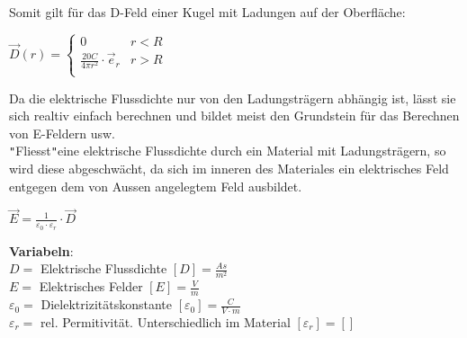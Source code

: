 Somit gilt für das D-Feld einer Kugel mit Ladungen auf der Oberfläche: \\
\begin{center}

	$
	\vec{D}(r) =
	\begin{cases}
		0                                       & r < R \\
		\frac{20 C}{4 \pi r^2} \cdot  \vec{e}_r & r > R \\
	\end{cases}$

\end{center}
\iend




Da die elektrische Flussdichte nur von den Ladungsträgern abhängig ist, lässt sie sich realtiv einfach berechnen und bildet meist den Grundstein für
das Berechnen von E-Feldern usw. \\
\texttt{"}Fliesst\texttt{"}eine elektrische Flussdichte durch ein Material mit Ladungsträgern, so wird diese abgeschwächt, da sich im inneren des Materiales ein
elektrisches Feld entgegen dem von Aussen angelegtem Feld ausbildet. \\
\begin{center}
\end{center}

\begingl
\begin{center}
	\formulaBegin
	$ \vec{E} = \frac{1}{\varepsilon_0 \cdot \varepsilon_r} \cdot \vec{D}$
	\formulaEnd
\end{center}
\textbf{Variabeln}: \\
$D = $ Elektrische Flussdichte $ [D] = \frac{As}{m^2}$ \\
$ E = $ Elektrisches Felder $[E] = \frac{V}{m}$ \\
$ \varepsilon_0 = $ Dielektrizitätskonstante $ [\varepsilon_0] = \frac{C}{V\cdot m}$ \\
$ \varepsilon_r = $ rel. Permitivität. Unterschiedlich im Material $ [\varepsilon_r] = [ ]$ \\

